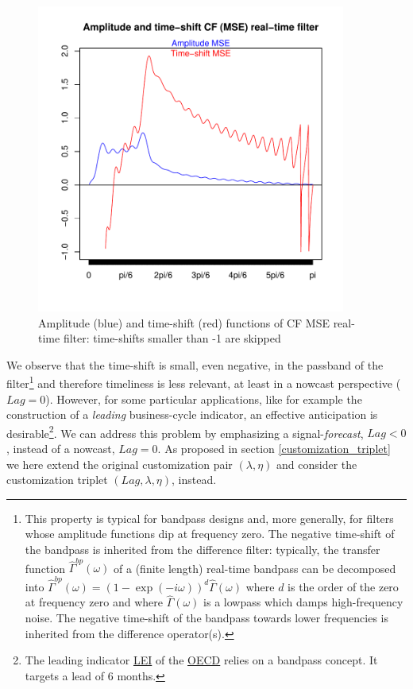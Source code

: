 \documentclass[a4paper]{book}
\begin{document}
\begin{figure}[H]\begin{center}\includegraphics[height=4in, width=4in]{z_amp_shift_dfa_mse_cf}\caption{Amplitude (blue) and time-shift (red) functions of CF MSE real-time filter: time-shifts smaller than -1 are skipped\label{z_amp_shift_dfa_mse_cf}}\end{center}\end{figure}We observe that the time-shift is small, even negative, in the passband of the filter\footnote{This property is typical for bandpass designs and, more generally, for filters whose amplitude functions dip at frequency zero. The negative time-shift of the bandpass is inherited from the difference filter: typically, the transfer function $\hat{\Gamma}^{bp}(\omega)$ of a (finite length) real-time bandpass can be decomposed into $\hat{\Gamma}^{bp}(\omega)=(1-\exp(-i\omega))^d\hat{\Gamma}(\omega)$ where $d$ is the order of the zero at frequency zero and where $\hat{\Gamma}(\omega)$ is a lowpass which damps high-frequency noise. The negative time-shift of the bandpass towards lower frequencies is inherited from the difference operator(s).} and therefore timeliness is less relevant, at least in a nowcast perspective ($Lag=0$). However, for some particular applications, like for example the construction of a \emph{leading} business-cycle indicator, an effective anticipation is desirable\footnote{The leading indicator \href{http://www.oecd.org/std/leading-indicators/}{LEI} of the \href{http://www.oecd.org/}{OECD} relies on a bandpass concept. It targets a lead of 6 months.}.  We can address this problem by emphasizing a signal-\emph{forecast}, $Lag<0$, instead of a nowcast, $Lag=0$. As proposed in section \ref{customization_triplet} we here extend the original customization pair $(\lambda,\eta)$ and consider the customization triplet $(Lag,\lambda,\eta)$, instead. 
\end{document}
